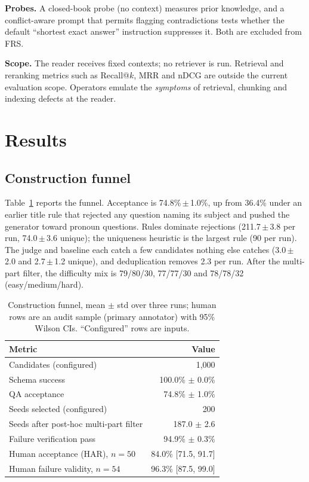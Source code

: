 \documentclass[conference]{IEEEtran}
\begin{document}
\textbf{Probes.} A closed-book probe (no context) measures prior knowledge, and a conflict-aware
prompt that permits flagging contradictions tests whether the default ``shortest exact answer''
instruction suppresses it. Both are excluded from FRS.

\textbf{Scope.}
\label{sec:scope}
The reader receives fixed contexts; no retriever is run. Retrieval and reranking metrics such as
Recall@$k$, MRR and nDCG are outside the current evaluation scope. Operators emulate the
\emph{symptoms} of retrieval, chunking and indexing defects at the reader.

\section{Results}
\subsection{Construction funnel}
Table~\ref{tab:pipeline} reports the funnel. Acceptance is 74.8\%\,$\pm$\,1.0\%, up from 36.4\%
under an earlier title rule that rejected any question naming its subject and pushed the
generator toward pronoun questions. Rules dominate rejections (211.7\,$\pm$\,3.8 per run,
74.0\,$\pm$\,3.6 unique); the uniqueness heuristic is the largest rule (90 per run). The judge and
baseline each catch a few candidates nothing else catches (3.0\,$\pm$\,2.0 and 2.7\,$\pm$\,1.2
unique), and deduplication removes 2.3 per run. After the multi-part filter, the difficulty mix
is 79/80/30, 77/77/30 and 78/78/32 (easy/medium/hard).

\begin{table}[t]
\centering
\caption{Construction funnel, mean $\pm$ std over three runs; human rows are an audit sample (primary annotator) with 95\% Wilson CIs. ``Configured'' rows are inputs.}
\label{tab:pipeline}
\footnotesize
\begin{tabular}{@{}lr@{}}
\toprule
Metric & Value \\
\midrule
Candidates (configured) & 1,000 \\
Schema success & 100.0\% $\pm$ 0.0\% \\
QA acceptance & 74.8\% $\pm$ 1.0\% \\
Seeds selected (configured) & 200 \\
Seeds after post-hoc multi-part filter & 187.0 $\pm$ 2.6 \\
Failure verification pass & 94.9\% $\pm$ 0.3\% \\
Human acceptance (HAR), $n{=}50$ & 84.0\% [71.5, 91.7] \\
Human failure validity, $n{=}54$ & 96.3\% [87.5, 99.0] \\
\bottomrule
\end{tabular}
\end{table}
\end{document}
